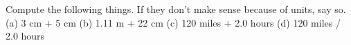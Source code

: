  Compute the following things. If they don't make sense
because of units, say so.\\
(a) 3 cm + 5 cm \hwendpart
(b) 1.11 m + 22 cm \hwendpart
(c) 120 miles + 2.0 hours \hwendpart
(d) 120 miles / 2.0 hours \hwendpart
